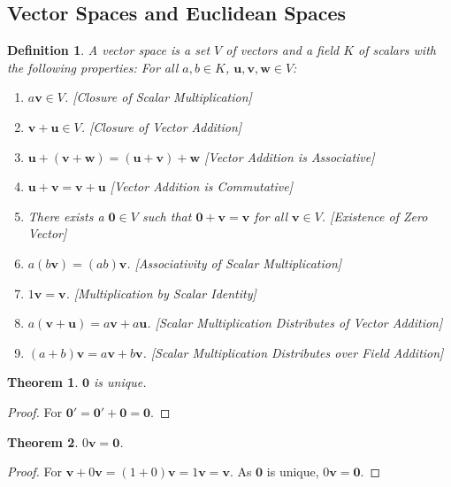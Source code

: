 \documentclass[12pt,oneside]{book}
\theoremstyle{mystyle}
\newtheorem{theorem}{Theorem}[section]
\newtheorem{definition}{Definition}[section]
\begin{document}
\subsection{Vector Spaces and Euclidean Spaces}
%
\begin{definition}
A vector space is a set $V$ of vectors and a field $K$ of scalars with the following properties: For all $a,b\in K$, $\mathbf{u,v,w}\in V$:
\begin{enumerate}
\item $a\mathbf{v} \in V$. \hfill [Closure of Scalar Multiplication]
\item $\mathbf{v}+\mathbf{u} \in V$. \hfill [Closure of Vector Addition]
\item $\mathbf{u}+(\mathbf{v}+\mathbf{w}) = (\mathbf{u}+\mathbf{v})+\mathbf{w}$ \hfill [Vector Addition is Associative]
\item $\mathbf{u}+\mathbf{v}=\mathbf{v}+\mathbf{u}$ \hfill [Vector Addition is Commutative]
\item There exists a $\mathbf{0}\in V$ such that $\mathbf{0}+\mathbf{v}=\mathbf{v}$ for all $\mathbf{v}\in V$. \hfill [Existence of Zero Vector]
\item $a(b\mathbf{v}) = (ab)\mathbf{v}$. \hfill [Associativity of Scalar Multiplication]
\item $1 \mathbf{v} = \mathbf{v}$. \hfill[Multiplication by Scalar Identity]
\item $a(\mathbf{v}+\mathbf{u}) = a\mathbf{v}+a\mathbf{u}$. \hfill [Scalar Multiplication Distributes of Vector Addition]
\item $(a+b)\mathbf{v}= a\mathbf{v}+b\mathbf{v}$. \hfill [Scalar Multiplication Distributes over Field Addition]
\end{enumerate}
\end{definition}

\begin{theorem}
$\mathbf{0}$ is unique.
\end{theorem}
\begin{proof}
For $\mathbf{0}'=\mathbf{0}'+\mathbf{0}=\mathbf{0}$.
\end{proof}

\begin{theorem}
$0\mathbf{v} = \mathbf{0}$.
\end{theorem}
\begin{proof}
For $\mathbf{v}+0\mathbf{v} = (1+0)\mathbf{v} = 1\mathbf{v} = \mathbf{v}$. As $\mathbf{0}$ is unique, $0\mathbf{v}=\mathbf{0}$.
\end{proof}
\end{document}
